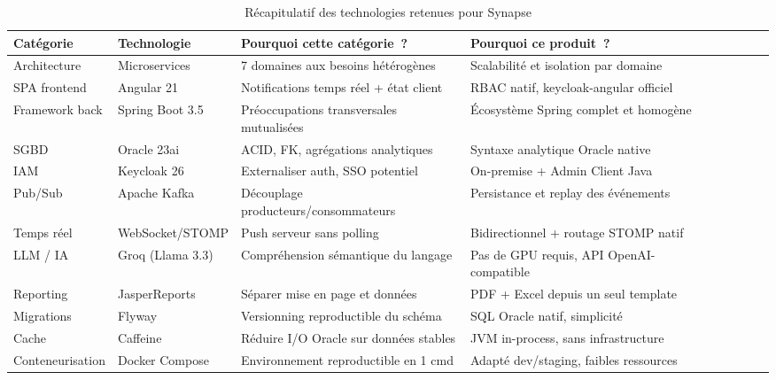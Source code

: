 \begin{table}[H]
\centering
\caption{Récapitulatif des technologies retenues pour Synapse}
\label{tab:recap_tech}
\begin{tabularx}{\textwidth}{VlVlVLVLV}
\hline
\textbf{Catégorie} & \textbf{Technologie} & \textbf{Pourquoi cette catégorie~?} & \textbf{Pourquoi ce produit~?} \\
\hline
Architecture    & Microservices       & 7 domaines aux besoins hétérogènes & Scalabilité et isolation par domaine \\
\hline
SPA frontend    & Angular 21          & Notifications temps réel + état client & RBAC natif, keycloak-angular officiel \\
\hline
Framework back  & Spring Boot 3.5     & Préoccupations transversales mutualisées & Écosystème Spring complet et homogène \\
\hline
SGBD            & Oracle 23ai         & ACID, FK, agrégations analytiques & Syntaxe analytique Oracle native \\
\hline
IAM             & Keycloak 26         & Externaliser auth, SSO potentiel & On-premise + Admin Client Java \\
\hline
Pub/Sub         & Apache Kafka        & Découplage producteurs/consommateurs & Persistance et replay des événements \\
\hline
Temps réel      & WebSocket/STOMP     & Push serveur sans polling & Bidirectionnel + routage STOMP natif \\
\hline
LLM / IA        & Groq (Llama 3.3)   & Compréhension sémantique du langage & Pas de GPU requis, API OpenAI-compatible \\
\hline
Reporting       & JasperReports       & Séparer mise en page et données & PDF + Excel depuis un seul template \\
\hline
Migrations      & Flyway              & Versionning reproductible du schéma & SQL Oracle natif, simplicité \\
\hline
Cache           & Caffeine            & Réduire I/O Oracle sur données stables & JVM in-process, sans infrastructure \\
\hline
Conteneurisation & Docker Compose     & Environnement reproductible en 1 cmd & Adapté dev/staging, faibles ressources \\
\hline
\end{tabularx}
\end{table}

